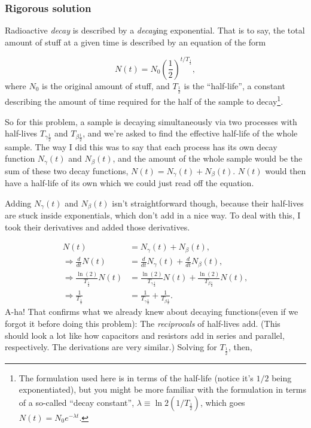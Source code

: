 \documentclass[11pt]{paper}
\begin{document}
\subsubsection*{Rigorous solution}
Radioactive \emph{decay} is described by a \emph{decay}ing exponential.  That is to say, the total amount of stuff at a given time is described by an equation of the form

\begin{equation}
N(t) = N_0 \left(\frac{1}{2}\right)^{t/T_{\frac{1}{2}}},
\end{equation}
where $N_0$ is the original amount of stuff, and $T_{\frac{1}{2}}$ is the ``half-life'', a constant describing the amount of time required for the half of the sample to decay\footnote{The formulation used here is in terms of the half-life (notice it's $1/2$ being exponentiated), but you might be more familiar with the formulation in terms of a so-called ``decay constant'', $\lambda \equiv \ln{2}\left(1/T_{\frac{1}{2}}\right)$, which goes $N(t) = N_0 e^{-\lambda t}$.}.

So for this problem, a sample is decaying simultaneously via two processes with half-lives $T_{\gamma\frac{1}{2}}$ and $T_{\beta\frac{1}{2}}$, and we're asked to find the effective half-life of the whole sample.  The way I did this was to say that each process has its own decay function $N_\gamma(t)$ and $N_\beta(t)$, and the amount of the whole sample would be the sum of these two decay functions, $N(t) = N_\gamma(t) + N_\beta(t)$.  $N(t)$ would then have a half-life of its own which we could just read off the equation.

Adding $N_\gamma(t)$ and $N_\beta(t)$ isn't straightforward though, because their half-lives are stuck inside exponentials, which don't add in a nice way.  To deal with this, I took their derivatives and added those derivatives.

\begin{align}
N(t) &= N_\gamma(t) + N_\beta(t),\\
\Rightarrow\frac{d}{dt}N(t) &= \frac{d}{dt}N_\gamma(t) + \frac{d}{dt}N_\beta(t),\\
\Rightarrow\frac{\ln{\left(2\right)}}{T_{\frac{1}{2}}}N(t)&= \frac{\ln{\left({2}\right)}}{T_{\gamma\frac{1}{2}}}N(t) + \frac{\ln{\left(2\right)}}{T_{\beta\frac{1}{2}}}N(t),\\
\Rightarrow \frac{1}{T_\frac{1}{2}} &= \frac{1}{T_{\gamma\frac{1}{2}}} + \frac{1}{T_{\beta\frac{1}{2}}}.
\end{align}
A-ha! That confirms what we already knew about decaying functions(even if we forgot it before doing this problem):  The \emph{reciprocals} of half-lives add.  (This should look a lot like how capacitors and resistors add in series and parallel, respectively.  The derivations are very similar.)  Solving for $T_{\frac{1}{2}}$, then,
\end{document}
